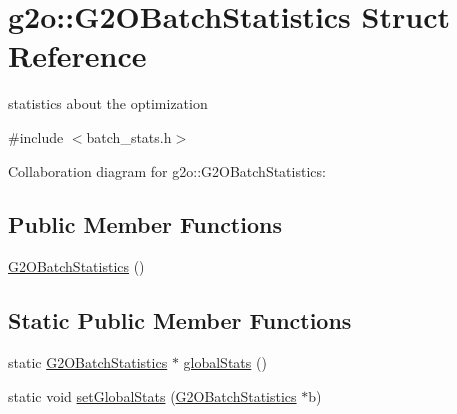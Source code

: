 \hypertarget{structg2o_1_1G2OBatchStatistics}{}\section{g2o\+:\+:G2\+O\+Batch\+Statistics Struct Reference}
\label{structg2o_1_1G2OBatchStatistics}


statistics about the optimization  




{\ttfamily \#include $<$batch\+\_\+stats.\+h$>$}



Collaboration diagram for g2o\+:\+:G2\+O\+Batch\+Statistics\+:
\subsection*{Public Member Functions}
\begin{DoxyCompactItemize}
\item 
\hyperlink{structg2o_1_1G2OBatchStatistics_a99b348cf1d6a913ab6683c44b36a8c55}{G2\+O\+Batch\+Statistics} ()
\end{DoxyCompactItemize}
\subsection*{Static Public Member Functions}
\begin{DoxyCompactItemize}
\item 
static \hyperlink{structg2o_1_1G2OBatchStatistics}{G2\+O\+Batch\+Statistics} $\ast$ \hyperlink{structg2o_1_1G2OBatchStatistics_a06f9c667d8b48b8f0023e27011818b64}{global\+Stats} ()
\item 
static void \hyperlink{structg2o_1_1G2OBatchStatistics_a8c56e85d25e346ba87718621407247fc}{set\+Global\+Stats} (\hyperlink{structg2o_1_1G2OBatchStatistics}{G2\+O\+Batch\+Statistics} $\ast$b)
\end{DoxyCompactItemize}
